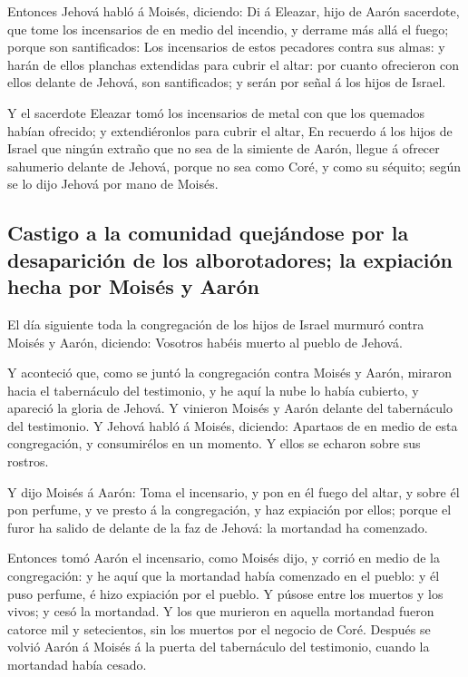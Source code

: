  Entonces Jehová habló á Moisés, diciendo:  Di
á Eleazar, hijo de Aarón sacerdote, que tome los incensarios de en medio
del incendio, y derrame más allá el fuego; porque son santificados:
 Los incensarios de estos pecadores contra sus almas: y
harán de ellos planchas extendidas para cubrir el altar: por cuanto
ofrecieron con ellos delante de Jehová, son santificados; y serán por
señal á los hijos de Israel.

 Y el sacerdote Eleazar tomó los incensarios de metal con
que los quemados habían ofrecido; y extendiéronlos para cubrir el altar,
 En recuerdo á los hijos de Israel que ningún extraño que
no sea de la simiente de Aarón, llegue á ofrecer sahumerio delante de
Jehová, porque no sea como Coré, y como su séquito; según se lo dijo
Jehová por mano de Moisés.

\hypertarget{castigo-a-la-comunidad-quejuxe1ndose-por-la-desapariciuxf3n-de-los-alborotadores-la-expiaciuxf3n-hecha-por-moisuxe9s-y-aaruxf3n}{%
\subsection{Castigo a la comunidad quejándose por la desaparición de los
alborotadores; la expiación hecha por Moisés y
Aarón}\label{castigo-a-la-comunidad-quejuxe1ndose-por-la-desapariciuxf3n-de-los-alborotadores-la-expiaciuxf3n-hecha-por-moisuxe9s-y-aaruxf3n}}

 El día siguiente toda la congregación de los hijos de
Israel murmuró contra Moisés y Aarón, diciendo: Vosotros habéis muerto
al pueblo de Jehová.

 Y aconteció que, como se juntó la congregación contra
Moisés y Aarón, miraron hacia el tabernáculo del testimonio, y he aquí
la nube lo había cubierto, y apareció la gloria de Jehová. 
Y vinieron Moisés y Aarón delante del tabernáculo del testimonio.
 Y Jehová habló á Moisés, diciendo:  Apartaos
de en medio de esta congregación, y consumirélos en un momento. Y ellos
se echaron sobre sus rostros.

 Y dijo Moisés á Aarón: Toma el incensario, y pon en él
fuego del altar, y sobre él pon perfume, y ve presto á la congregación,
y haz expiación por ellos; porque el furor ha salido de delante de la
faz de Jehová: la mortandad ha comenzado.

 Entonces tomó Aarón el incensario, como Moisés dijo, y
corrió en medio de la congregación: y he aquí que la mortandad había
comenzado en el pueblo: y él puso perfume, é hizo expiación por el
pueblo.  Y púsose entre los muertos y los vivos; y cesó la
mortandad.  Y los que murieron en aquella mortandad fueron
catorce mil y setecientos, sin los muertos por el negocio de Coré.
 Después se volvió Aarón á Moisés á la puerta del
tabernáculo del testimonio, cuando la mortandad había cesado.


